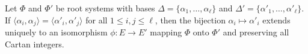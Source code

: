Let $\Phi$ and $\Phi'$ be root systems with bases $\Delta = \{\alpha_1, \ldots, \alpha_\ell\}$ and $\Delta' = \{\alpha'_1, \ldots, \alpha'_\ell\}$. If $\langle \alpha_i, \alpha_j \rangle = \langle \alpha'_i, \alpha'_j \rangle$ for all $1 \leq i, j \leq \ell$, then the bijection $\alpha_i \mapsto \alpha'_i$ extends uniquely to an isomorphism $\phi: E \to E'$ mapping $\Phi$ onto $\Phi'$ and preserving all Cartan integers.